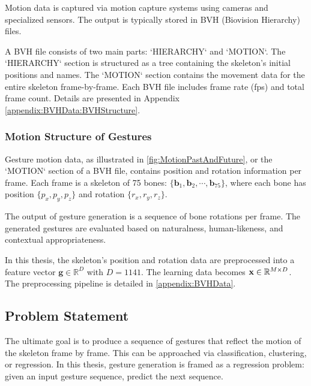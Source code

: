 Motion data is captured via motion capture systems using cameras and specialized sensors. The output is typically stored in BVH (Biovision Hierarchy) files.

A BVH file consists of two main parts: `HIERARCHY` and `MOTION`. The `HIERARCHY` section is structured as a tree containing the skeleton’s initial positions and names. The `MOTION` section contains the movement data for the entire skeleton frame-by-frame. Each BVH file includes frame rate (fps) and total frame count. Details are presented in Appendix \autoref{appendix:BVHData:BVHStructure}.

\subsubsection{Motion Structure of Gestures}

Gesture motion data, as illustrated in \autoref{fig:MotionPastAndFuture}, or the `MOTION` section of a BVH file, contains position and rotation information per frame. Each frame is a skeleton of 75 bones: $\{ \textbf{b}_{1}, \textbf{b}_{2}, \cdots , \textbf{b}_{75} \}$, where each bone has position $\{ p_{x}, p_{y}, p_{z} \}$ and rotation $\{ r_{x}, r_{y}, r_{z} \}$.

The output of gesture generation is a sequence of bone rotations per frame. The generated gestures are evaluated based on naturalness, human-likeness, and contextual appropriateness.

In this thesis, the skeleton’s position and rotation data are preprocessed into a feature vector $\mathbf{g} \in \mathbb{R}^{D}$ with $D = 1141$. The learning data becomes $\mathbf{x} \in \mathbb{R}^{M \times D}$. The preprocessing pipeline is detailed in \autoref{appendix:BVHData}.

\subsection{Problem Statement}
\label{sec:ProblemStatement}

The ultimate goal is to produce a sequence of gestures that reflect the motion of the skeleton frame by frame. This can be approached via classification, clustering, or regression. In this thesis, gesture generation is framed as a regression problem: given an input gesture sequence, predict the next sequence.


